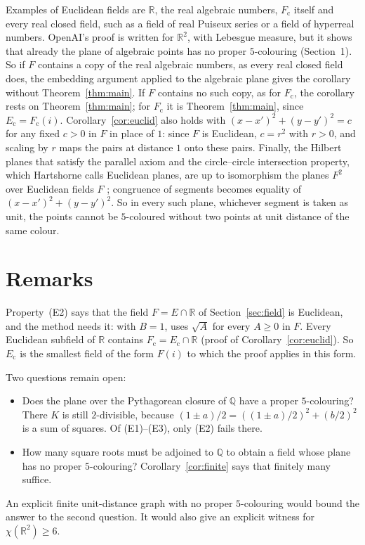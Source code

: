 \documentclass[11pt,a4paper]{amsart}
\theoremstyle{remark}
\newcommand{\Q}{\mathbb{Q}}
\newcommand{\R}{\mathbb{R}}
\newcommand{\Ec}{E_{\mathrm{c}}}
\begin{document}
Examples of Euclidean fields are $\R$, the real algebraic numbers, $F_{\mathrm c}$ itself and every real closed field,
such as a field of real Puiseux series or a field of hyperreal numbers. OpenAI's proof is written for $\R^2$, with
Lebesgue measure, but it shows that already the plane of algebraic points has no proper $5$-colouring
(Section~1). So if $F$ contains a copy of the real algebraic numbers, as every real closed field does, the embedding
argument applied to the algebraic plane gives the corollary without Theorem~\ref{thm:main}. If $F$ contains no such
copy, as for $F_{\mathrm c}$, the corollary rests on Theorem~\ref{thm:main}; for $F_{\mathrm c}$ it is
Theorem~\ref{thm:main}, since $\Ec=F_{\mathrm c}(i)$. Corollary~\ref{cor:euclid} also holds with $(x-x')^2+(y-y')^2=c$ for any fixed
$c>0$ in $F$ in place of $1$: since $F$ is Euclidean, $c=r^2$ with $r>0$, and scaling by $r$ maps the pairs at
distance $1$ onto these pairs. Finally, the Hilbert planes
that satisfy the parallel axiom and the circle--circle intersection property, which Hartshorne calls Euclidean
planes, are up to isomorphism the planes $F^2$ over Euclidean fields $F$ \cite{Hartshorne}; congruence of segments
becomes equality of $(x-x')^2+(y-y')^2$. So in every such plane, whichever segment is taken as unit, the points
cannot be $5$-coloured without two points at unit distance of the same colour.

\section{Remarks}

Property~(E2) says that the field $F=E\cap\R$ of Section~\ref{sec:field} is Euclidean, and the method needs it: with $B=1$,
\cite[Lemma~3.3]{OpenAI} uses $\sqrt A$ for every $A\ge0$ in $F$. Every Euclidean subfield of $\R$ contains
$F_{\mathrm c}=\Ec\cap\R$ (proof of Corollary~\ref{cor:euclid}). So $\Ec$ is the smallest field of the form $F(i)$ to which the proof applies in this form.

Two questions remain open:
\begin{itemize}
\item Does the plane over the Pythagorean closure of $\Q$ have a proper $5$-colouring? There $K$ is still
$2$-divisible, because $(1\pm a)/2=((1\pm a)/2)^2+(b/2)^2$ is a sum of squares. Of (E1)--(E3), only (E2) fails there.
\item How many square roots must be adjoined to $\Q$ to obtain a field whose plane has no proper $5$-colouring?
Corollary~\ref{cor:finite} says that finitely many suffice.
\end{itemize}
An explicit finite unit-distance graph with no proper $5$-colouring would bound the answer to the second question. It
would also give an explicit witness for $\chi(\R^2)\ge6$.
\end{document}
